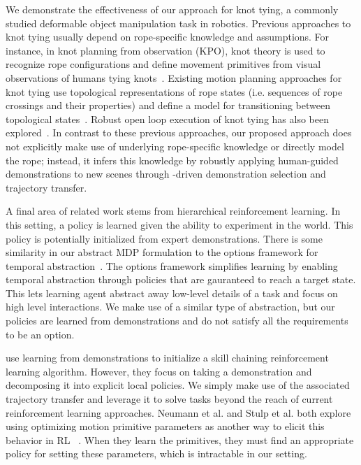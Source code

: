 We demonstrate the effectiveness of our approach for
knot tying, a commonly studied deformable object manipulation task in robotics.
Previous approaches to knot tying usually depend on rope-specific knowledge
and assumptions.
For instance, in knot planning from observation (KPO), knot theory is used
to recognize rope configurations and define
movement primitives from visual observations of humans tying
knots~\cite{Morita_ICRA2003, Takamatsu_TransRob2006}.
Existing motion planning approaches for knot tying use topological
representations of rope states (i.e. sequences of rope crossings and their
properties) and define a model for transitioning between topological
states~\cite{Moll_IEEERobot2006, Saha_ExpRobotics2008, Wakamatsu_IJRR2006}.
Robust open loop execution of knot tying has also been explored~\cite{Bell_PhD2010}.
In contrast to these previous approaches, our proposed approach does not
explicitly make use of underlying rope-specific
knowledge or directly model the rope; instead, it infers this knowledge by
robustly applying human-guided demonstrations to new scenes through
\mmql{}-driven demonstration selection and trajectory transfer.

A final area of related work stems from hierarchical reinforcement learning. 
In this setting, a policy is learned given the ability to experiment in the world.
This policy is potentially initialized from expert demonstrations.
There is some similarity in our abstract MDP formulation to the options 
framework for temporal abstraction~\cite{sutton1999between}.
The options framework simplifies learning by enabling temporal abstraction through
policies that are gauranteed to reach a target state. 
This lets learning agent abstract away low-level details of a task and focus on 
high level interactions. 
We make use of a similar type of abstraction, but our policies are learned from 
demonstrations and do not satisfy all the requirements to be an option.

\citet{konidaris2010constructing} use learning from demonstrations to initialize a skill chaining reinforcement learning algorithm.
However, they focus on taking a demonstration and decomposing it into explicit local policies.
We simply make use of the associated trajectory transfer and leverage it to solve tasks beyond the reach of current reinforcement learning approaches.
Neumann et al. and Stulp et al. both explore using optimizing motion primitive parameters as another way to elicit this behavior in RL ~\cite{Neumann09learningcomplex, Stulp_ROB2012}.
When they learn the primitives, they must find an appropriate policy for setting these parameters, which is intractable in our setting.
